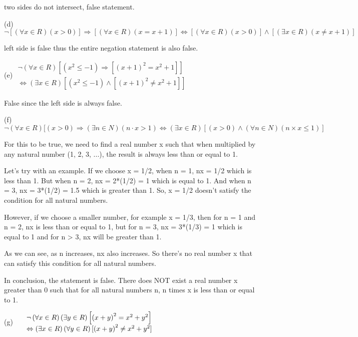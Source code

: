 \documentclass{article}
\begin{document}
two sides do not intersect, false statement.

(d) $\neg[(\forall x\in R)(x>0)]\Rightarrow[(\forall x\in R)(x=x+1)] \iff \left[\left(\forall x\in R\right)(x>0)\right]\land\left[\left(\exists x\in R\right)\left(x\neq x+1\right)\right]$


left side is false thus the entire negation statement is also false.

(e) $\begin{matrix}\neg\left(\forall x\in R\right)\left[\left(x^{2}\leq-1\right)\Rightarrow\left[\left(x+1\right)^{2}=x^{2}+1\right]\right]\\ \Longleftrightarrow\left(\exists x\in R\right)\left[\left(x^{2}\leq-1\right)\land\left[\left(x+1\right)^{2}\neq x^{2}+1\right]\right]\end{matrix}$

False since the left side is always false. 

(f) $\neg(\forall x\in R)[(x>0)\Rightarrow(\exists n\in N)(n\cdot x>1) \iff (\exists x\in R)[(x>0)\land(\forall n\in N)\left(n\times x\leq1\right)]$

For this to be true, we need to find a real number x such that when multiplied by any natural number (1, 2, 3, ...), the result is always less than or equal to 1.

Let's try with an example. If we choose x = 1/2, when n = 1, nx = 1/2 which is less than 1. But when n = 2, nx = 2*(1/2) = 1 which is equal to 1. And when n = 3, nx = 3*(1/2) = 1.5 which is greater than 1. So, x = 1/2 doesn't satisfy the condition for all natural numbers.

However, if we choose a smaller number, for example x = 1/3, then for n = 1 and n = 2, nx is less than or equal to 1, but for n = 3, nx = 3*(1/3) = 1 which is equal to 1 and for n > 3, nx will be greater than 1.

As we can see, as n increases, nx also increases. So there's no real number x that can satisfy this condition for all natural numbers.

In conclusion, the statement is false. There does NOT exist a real number x greater than 0 such that for all natural numbers n, n times x is less than or equal to 1.

(g) $\begin{array}{l l}{{}}&{{\neg\left(\forall x\in R\right)\left(\exists y\in R\right)\left[\left(x+y\right)^{2}=x^{2}+y^{2}\right]}}\\ {{}}&{{\Leftrightarrow\left(\exists x\in R\right)\left(\forall y\in R\right)[\left(x+y\right)^{2}\neq x^{2}+y^{2}]}}\\ \end{array}$
\end{document}
